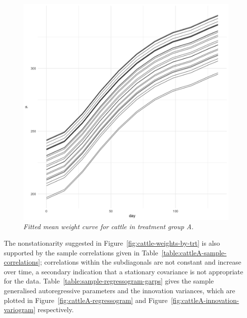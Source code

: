 \begin{figure}[H] 
\caption{\textit{Fitted mean weight curve for cattle in treatment group A. }}
\begin{center}
\includegraphics[width = \textwidth]{img/cattle/cattleA-weights-vs-time-mean-fit}
\end{center}\label{fig:cattleA-smoothed-weights-vs-time}
\end{figure} 

The nonstationarity suggested in Figure~\ref{fig:cattle-weights-by-trt} is also supported by the sample correlations given in Table~\ref{table:cattleA-sample-correlations}; correlations within the subdiagonals are not constant and increase over time, a secondary indication that a stationary covariance is not appropriate for the data.  Table~\ref{table:sample-regressogram-garps} gives the sample generalised autoregressive parameters and the innovation variances, which are plotted in Figure~\ref{fig:cattleA-regressogram} and Figure~\ref{fig:cattleA-innovation-variogram} respectively. 

